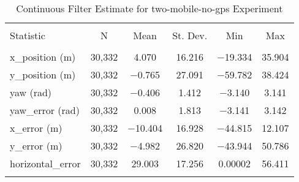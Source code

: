 
\begin{table}[h] \centering 
  \caption{Continuous Filter Estimate for two-mobile-no-gps Experiment} 
  \label{tab:two_mobile_no_gps_continuous_summary} 
\begin{tabular}{@{\extracolsep{5pt}}lccccc} 
\\[-1.8ex]\hline 
\hline \\[-1.8ex] 
Statistic & \multicolumn{1}{c}{N} & \multicolumn{1}{c}{Mean} & \multicolumn{1}{c}{St. Dev.} & \multicolumn{1}{c}{Min} & \multicolumn{1}{c}{Max} \\ 
\hline \\[-1.8ex] 
x\_position (m) & 30,332 & \num{4.070} & \num{16.216} & \num{-19.334} & \num{35.904} \\ 
y\_position (m) & 30,332 & \num{-0.765} & \num{27.091} & \num{-59.782} & \num{38.424} \\ 
yaw (rad) & 30,332 & \num{-0.406} & \num{1.412} & \num{-3.140} & \num{3.141} \\ 
yaw\_error (rad) & 30,332 & \num{0.008} & \num{1.813} & \num{-3.141} & \num{3.142} \\ 
x\_error (m) & 30,332 & \num{-10.404} & \num{16.928} & \num{-44.815} & \num{12.107} \\ 
y\_error (m) & 30,332 & \num{-4.982} & \num{26.820} & \num{-43.944} & \num{50.786} \\ 
horizontal\_error & 30,332 & \num{29.003} & \num{17.256} & \num{0.00002} & \num{56.411} \\ 
\hline \\[-1.8ex] 
\end{tabular} 
\end{table} 
